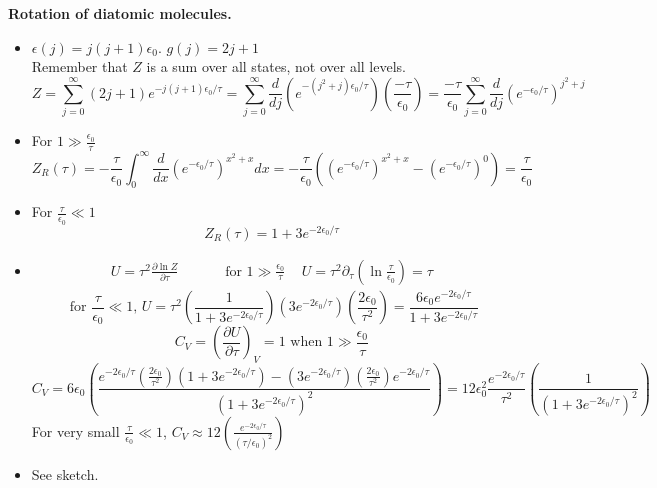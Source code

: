  \textbf{Rotation of diatomic molecules.} 
\begin{itemize}
\item[(a)] $\epsilon(j) = j(j+1) \epsilon_0$.  $g(j) = 2j+1$  \\
Remember that $Z$ is a sum over all states, not over all levels.  
\[
Z = \sum_{j=0}^{\infty} (2j+1) e^{-j(j+1) \epsilon_0 /\tau} = \sum_{j=0}^{\infty} \frac{d}{dj} (e^{- (j^2  + j) \epsilon_0/\tau } ) \left( \frac{-\tau}{\epsilon_0} \right) = \frac{-\tau}{\epsilon_0} \sum_{j=0}^{\infty} \frac{d}{dj}  \left( e^{-\epsilon_0/\tau} \right)^{j^2 + j} 
\]
\item[(b)] For $1 \gg \frac{\epsilon_0}{\tau}$
\[
Z_R(\tau)  =-\frac{\tau}{\epsilon_0} \int_0^{\infty} \frac{d}{dx}  \left( e^{-\epsilon_0/\tau} \right)^{x^2 +  x}  dx = -\frac{\tau}{\epsilon_0} \left( (e^{-\epsilon_0/\tau})^{x^2 + x} - (e^{-\epsilon_0/\tau} )^0 \right) = \frac{\tau}{\epsilon_0}
\]
\item[(c)] For $\frac{\tau}{\epsilon_0} \ll 1$
\[
Z_R(\tau) = 1 + 3 e^{-2\epsilon_0 /\tau}
\]
\item[(d)] 
\[
\begin{gathered}
  U = \tau^2 \frac{\partial \ln{Z}}{ \partial \tau} \quad \quad \quad \text{ for } 1 \gg \frac{\epsilon_0 }{\tau} \quad \, U  =\tau^2  \partial_{\tau} \left( \ln{ \frac{\tau}{\epsilon_0} } \right) = \tau
\end{gathered}
\]
\[
\text{ for } \frac{\tau }{\epsilon_0 } \ll 1, \, U = \tau^2 \left( \frac{1}{ 1 + 3 e^{-2\epsilon_0/\tau}  } \right) (3e^{-2\epsilon_0/\tau }) \left( \frac{2\epsilon_0 }{\tau^2} \right) = \frac{ 6 \epsilon_0 e^{-2\epsilon_0/\tau} }{ 1 + 3 e^{-2\epsilon_0/\tau } }
\]
\[
\boxed{ C_V = \left( \frac{ \partial U}{ \partial \tau} \right)_V = 1 \text{ when } 1 \gg \frac{\epsilon_0}{\tau} }
\]
\[
C_V = 6 \epsilon_0 \left( \frac{ e^{-2\epsilon_0/\tau} \left( \frac{2\epsilon_0 }{\tau^2 }\right) (1 + 3 e^{-2\epsilon_0/\tau} ) - (3e^{-2\epsilon_0/ \tau} )\left( \frac{2\epsilon_0 }{\tau^2 } \right)e^{-2\epsilon_0/\tau} }{ (1 + 3e^{-2\epsilon_0/\tau} )^2 } \right) = 12 \epsilon_0^2 \frac{e^{-2\epsilon_0/\tau }}{\tau^2 }\left( \frac{1}{  ( 1 + 3 e^{-2\epsilon_0/\tau} )^2 } \right)
\]
For very small $\frac{\tau }{\epsilon_0} \ll 1$, $\boxed{ C_V \approx 12 \left( \frac{ e^{-2\epsilon_0 /\tau } }{ (\tau/\epsilon_0 )^2 } \right)}$  
\item[(e)] See sketch.
\end{itemize}






